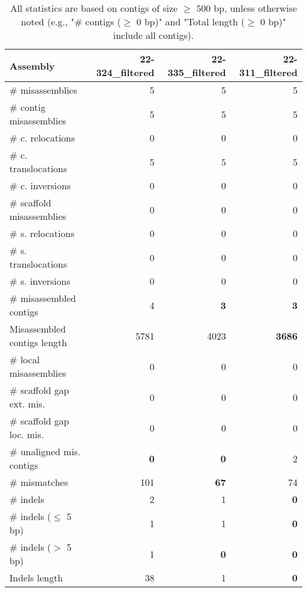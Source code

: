 \documentclass[12pt,a4paper]{article}
\begin{document}
\begin{table}[ht]
\begin{center}
\caption{All statistics are based on contigs of size $\geq$ 500 bp, unless otherwise noted (e.g., "\# contigs ($\geq$ 0 bp)" and "Total length ($\geq$ 0 bp)" include all contigs).}
\begin{tabular}{|l*{3}{|r}|}
\hline
Assembly & 22-324\_filtered & 22-335\_filtered & 22-311\_filtered \\ \hline
\# misassemblies & 5 & 5 & 5 \\ \hline
\hspace{2mm}\# contig misassemblies & 5 & 5 & 5 \\ \hline
\hspace{5mm}\# c. relocations & 0 & 0 & 0 \\ \hline
\hspace{5mm}\# c. translocations & 5 & 5 & 5 \\ \hline
\hspace{5mm}\# c. inversions & 0 & 0 & 0 \\ \hline
\hspace{2mm}\# scaffold misassemblies & 0 & 0 & 0 \\ \hline
\hspace{5mm}\# s. relocations & 0 & 0 & 0 \\ \hline
\hspace{5mm}\# s. translocations & 0 & 0 & 0 \\ \hline
\hspace{5mm}\# s. inversions & 0 & 0 & 0 \\ \hline
\# misassembled contigs & 4 & {\bf 3} & {\bf 3} \\ \hline
Misassembled contigs length & 5781 & 4023 & {\bf 3686} \\ \hline
\# local misassemblies & 0 & 0 & 0 \\ \hline
\# scaffold gap ext. mis. & 0 & 0 & 0 \\ \hline
\# scaffold gap loc. mis. & 0 & 0 & 0 \\ \hline
\# unaligned mis. contigs & {\bf 0} & {\bf 0} & 2 \\ \hline
\# mismatches & 101 & {\bf 67} & 74 \\ \hline
\# indels & 2 & 1 & {\bf 0} \\ \hline
\hspace{5mm}\# indels ($\leq$ 5 bp) & 1 & 1 & {\bf 0} \\ \hline
\hspace{5mm}\# indels ($>$ 5 bp) & 1 & {\bf 0} & {\bf 0} \\ \hline
Indels length & 38 & 1 & {\bf 0} \\ \hline
\end{tabular}
\end{center}
\end{table}
\end{document}

